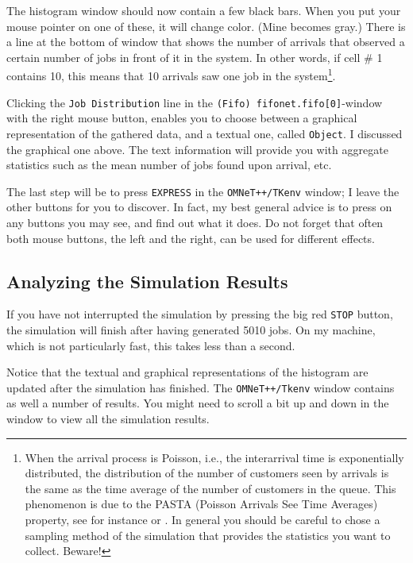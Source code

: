 \documentclass[a4paper]{article}
\begin{document}
The histogram window should now contain a few black bars. When you put
your mouse pointer on one of these, it will change color. (Mine
becomes gray.) There is a line at the bottom of window that shows
the number of arrivals that observed a certain number of jobs in front
of it in the system.  In other words, if cell \# 1 contains 10, this
means that 10 arrivals saw one job in the
system\footnote{\label{fn:1}When the arrival process is Poisson, i.e.,
  the interarrival time is exponentially distributed, the distribution
  of the number of customers seen by arrivals is the same as the time
  average of the number of customers in the queue. This phenomenon is
  due to the PASTA (Poisson Arrivals See Time Averages) property, see
  for instance \cite{Ross93} or
  \cite{el-taha98:_sampl_path_analy_queuein_system}. In general you
  should be careful to chose a sampling method of the simulation that
  provides the statistics you want to collect. Beware!}.

Clicking  the \texttt{Job Distribution} line in the
\texttt{(Fifo) fifonet.fifo[0]}-window with the right mouse button, enables
you to choose between a graphical representation of the gathered data,
and a textual one, called \texttt{Object}. I discussed the graphical
one above. The text information will provide you with aggregate statistics
such as the mean number of jobs found upon arrival, etc.

The last step will be to press \texttt{EXPRESS} in the
\texttt{OMNeT++/TKenv} window; I leave the other
buttons for you to discover. In fact, my best general advice is to
press on any buttons you may see, and find out what it does. Do not
forget that often both mouse buttons, the left and the right, can be
used for different effects.


\subsection{Analyzing the Simulation Results}
\label{sec:interpreting-results}
If you have not interrupted the simulation by pressing the big red
\texttt{STOP} button, the simulation will finish after having
generated 5010 jobs. On my machine, which is not particularly fast,
this takes less than a second.

Notice that the textual and graphical representations of the histogram
are updated after the simulation has finished. The
\texttt{OMNeT++/Tkenv} window contains as well a number of results.
You might need to scroll a bit up and down in the window to view all
the simulation results.
\end{document}
